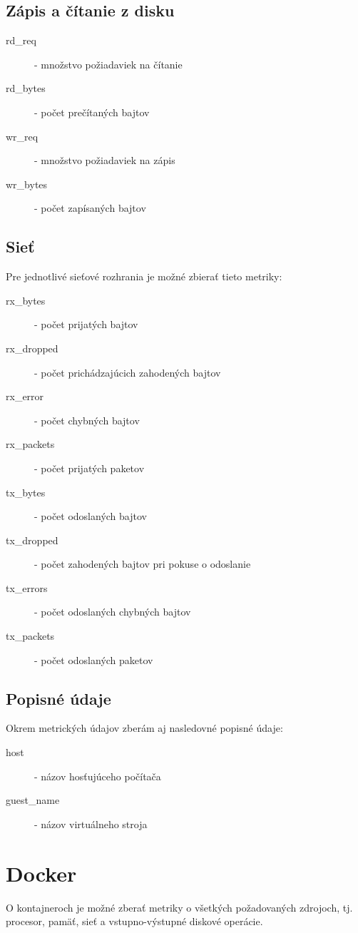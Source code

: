 \documentclass[printed,11pt,twoside,color,cover,table]{fithesis3}
\begin{document}
\subsection{Zápis a čítanie z disku}
\begin{description}
\item[rd\_req] - množstvo požiadaviek na čítanie
\item[rd\_bytes] - počet prečítaných bajtov
\item[wr\_req] - množstvo požiadaviek na zápis
\item[wr\_bytes] - počet zapísaných bajtov
\end{description}

\subsection{Sieť}
Pre jednotlivé sieťové rozhrania je možné zbierať tieto metriky:
\begin{description}
\item[rx\_bytes] - počet prijatých bajtov
\item[rx\_dropped] - počet prichádzajúcich zahodených bajtov
\item[rx\_error] - počet chybných bajtov
\item[rx\_packets] - počet prijatých paketov
\item[tx\_bytes] - počet odoslaných bajtov
\item[tx\_dropped] - počet zahodených bajtov pri pokuse o odoslanie
\item[tx\_errors] - počet odoslaných chybných bajtov
\item[tx\_packets] - počet odoslaných paketov
\end{description}

\subsection{Popisné údaje}
Okrem metrických údajov zberám aj nasledovné popisné údaje:
\begin{description}
\item[host] - názov hosťujúceho počítača
\item[guest\_name] - názov virtuálneho stroja
\end{description}

\section{Docker}
O kontajneroch je možné zberať metriky o všetkých požadovaných zdrojoch, tj. procesor, pamäť, sieť a vstupno-výstupné diskové operácie.
\end{document}
